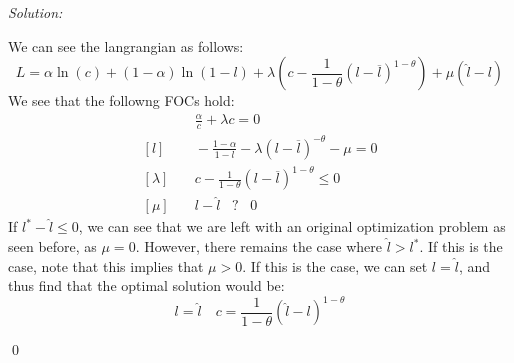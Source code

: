 \documentclass[12pt]{article}
\newenvironment{subsol}
    {\emph{Solution:}
    }
    {
    \qed
    }
\begin{document}
\begin{subsol}
    We can see the langrangian as follows:
    \[
    L = \alpha \ln(c) + (1-\alpha) \ln(1-l) + \lambda \left(c - \frac{1}{1-\theta}(l - \overline{l})^{1-\theta}\right) + \mu (\hat{l} - l)
    \]
    We see that the followng FOCs hold:
    \begin{align*}
        [c] & \quad \frac{\alpha}{c} + \lambda c = 0\\
        [l] & \quad -\frac{1-\alpha}{1-l} - \lambda (l -\overline{l})^{-\theta} - \mu = 0\\
        [\lambda] & \quad c - \frac{1}{1-\theta}(l - \overline{l})^{1-\theta} \leq 0 \\
        [\mu] & \quad l - \hat{l} \hspace{10pt} ? \hspace{10pt} 0 
    \end{align*}
    If $l^* - \hat{l} \leq 0$, we can see that we are left with an original optimization problem as seen before, as $\mu = 0$. However, there remains the case where $\hat{l} > l^*$. If this is the case, note that this implies that $\mu > 0 $. If this is the case, we can set $l = \hat{l}$, and thus find that the optimal solution would be:
    \[
    l = \hat{l} \quad c = \frac{1}{1-\theta}(\hat{l} - l)^{1-\theta}
    \]
\end{subsol}

\end{document}

